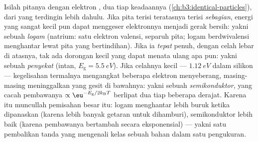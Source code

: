 \begin{definition}\label{def:b3:electrons-in-solids:classes}
Isilah pitanya dengan elektron , dua tiap keadaannya
(\cref{ch:b3:identical-particles}), dari yang terdingin lebih dahulu. Jika pita
terisi teratasnya terisi \emph{sebagian}, energi yang sangat kecil pun dapat
menggeser elektronnya menjadi gerak bersih: yakni sebuah \emph{logam} (natrium: satu
elektron valensi, separuh pita; logam berdwivalensi menghantar lewat
pita yang bertindihan). Jika ia \emph{tepat} penuh, dengan celah lebar
di atasnya, tak ada dorongan kecil yang dapat menata ulang apa pun: yakni sebuah \emph{penyekat}
(intan, $E_{\text{g}} = \qty{5.5}{eV}$). Jika celahnya kecil ---
$\qty{1.12}{eV}$ dalam silikon --- kegelisahan termalnya mengangkat beberapa
elektron menyeberang, masing-masing meninggalkan \emph{} yang gesit di
bawahnya: yakni sebuah \emph{semikonduktor}, yang cacah pembawanya
$\propto\eu^{-E_{\text{g}}/2k_{\text{B}}T}$ berlipat dua tiap beberapa
derajat. Karena itu muncullah pemisahan besar itu: logam menghantar lebih buruk
ketika dipanaskan (karena lebih banyak getaran untuk dihamburi), semikonduktor lebih baik
(karena pembawanya bertambah secara eksponensial) --- yakni satu pembalikan tanda yang mengenali
kelas sebuah bahan dalam satu pengukuran.
\end{definition}

